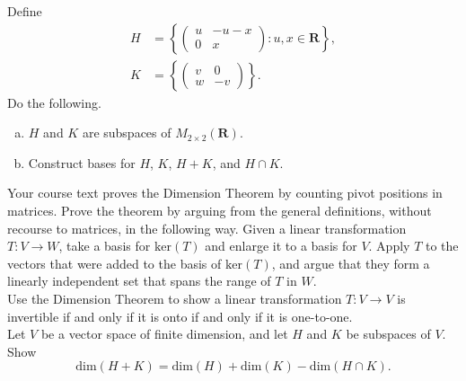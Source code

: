 \documentclass[a4paper,11pt]{article}
\newcommand{\R}{\mathbf{R}}
\newcommand{\ddim}{\text{dim}}
\begin{document}
 Define
\begin{align*}
  H &=
      \left\{
      \begin{pmatrix}
        u & -u-x \\ 0 & x
      \end{pmatrix}
      : u,x \in \R
      \right\}, \\
  K &=
      \left\{
      \begin{pmatrix}
        v & 0 \\ w & -v
      \end{pmatrix}
      \right\}.
\end{align*}
Do the following.
\begin{enumerate}[(a)]
\item $H$ and $K$ are subspaces of $M_{2 \times 2}(\R)$.
\item Construct bases for $H$, $K$, $H+K$, and $H \cap K$. \\
\end{enumerate}

 Your course text proves the Dimension Theorem by
counting pivot positions in matrices. Prove the theorem by arguing from the
general definitions, without recourse to matrices, in the following way. Given a
linear transformation $T : V \rightarrow W$, take a basis for $\text{ker}(T)$
and enlarge it to a basis for $V$. Apply $T$ to the vectors that were added to
the basis of $\text{ker}(T)$, and argue that they form a linearly independent
set that spans the range of $T$ in $W$. \\

 Use the Dimension Theorem to show a linear
transformation $T: V \rightarrow V$ is invertible if and only if it is onto if
and only if it is one-to-one. \\

 Let $V$ be a vector space of finite dimension,
and let $H$ and $K$ be subspaces of $V$. Show
\[
  \ddim(H+K) = \ddim(H) + \ddim(K) - \ddim(H \cap K).
\]
\end{document}
